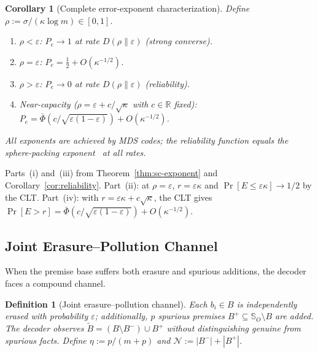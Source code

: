 \documentclass[journal]{IEEEtran}
\makeatletter
\newtheorem{corollary}{Corollary}[section]
\newtheorem{definition}{Definition}[section]
\numberwithin{equation}{section}
\renewenvironment{proof}[1][\proofname]{\par
  \pushQED{\qed}%
  \normalfont \topsep6\p@\@plus6\p@\relax
  \trivlist
  \item[\hskip\labelsep
        \itshape
    #1\@addpunct{.}]\ignorespaces
}{%
  \popQED\endtrivlist\@endpefalse
}
\makeatother
\begin{document}
\begin{corollary}[Complete error-exponent characterization]
\label{cor:error-landscape}
Define $\rho:=\sigma/(\kappa\log m)\in[0,1]$.
\begin{enumerate}[label=\textup{(\roman*)}]
\item $\rho<\varepsilon$: $P_e\to 1$ at rate
$D(\rho\|\varepsilon)$ \textup{(strong converse)}.
\item $\rho=\varepsilon$:
$P_e=\frac{1}{2}+O(\kappa^{-1/2})$.
\item $\rho>\varepsilon$: $P_e\to 0$ at rate
$D(\rho\|\varepsilon)$ \textup{(reliability)}.
\item Near-capacity
\textup{(}$\rho=\varepsilon{+}c/\sqrt\kappa$ with
$c\in\mathbb R$ fixed\textup{)}:
$P_e=\bar\Phi(c/\sqrt{\varepsilon(1{-}\varepsilon)})
+O(\kappa^{-1/2})$.
\end{enumerate}
All exponents are achieved by MDS codes; the reliability
function equals the sphere-packing
exponent~\cite[Theorem~5.8.3]{gallager1968information} at all rates.
\end{corollary}

\begin{proof}
Parts~(i) and~(iii) from
Theorem~\ref{thm:sc-exponent} and
Corollary~\ref{cor:reliability}.
Part~(ii): at $\rho=\varepsilon$,
$r=\varepsilon\kappa$ and
$\Pr[E\le\varepsilon\kappa]\to 1/2$ by the CLT.
Part~(iv): with $r=\varepsilon\kappa+c\sqrt\kappa$,
the CLT gives
$\Pr[E>r]
 =\bar\Phi(c/\sqrt{\varepsilon(1{-}\varepsilon)})
 +O(\kappa^{-1/2})$.
\end{proof}

\subsection{Joint Erasure--Pollution Channel}
\label{subsec:joint-channel}

When the premise base suffers both erasure and spurious additions,
the decoder faces a compound channel.

\begin{definition}[Joint erasure--pollution channel]
\label{def:joint-channel}
Each $b_i\in B$ is independently erased with probability
$\varepsilon$; additionally, $p$ spurious premises
$B^+\subseteq\mathbb{S}_O\setminus B$ are added.
The decoder observes
$\tilde B=(B\setminus B^-)\cup B^+$ without distinguishing
genuine from spurious facts.
Define $\eta:=p/(m{+}p)$ and
$\mathcal N:=|B^-|+|B^+|$.
\end{definition}
\end{document}

